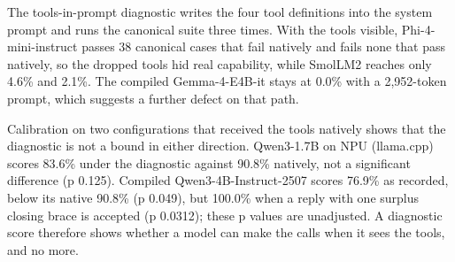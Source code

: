 \documentclass[11pt]{article}
\begin{document}
The tools-in-prompt diagnostic writes the four tool definitions into the system prompt and runs the canonical suite three times. With the tools visible, Phi-4-mini-instruct passes 38 canonical cases that fail natively and fails none that pass natively, so the dropped tools hid real capability, while SmolLM2 reaches only 4.6\% and 2.1\%. The compiled Gemma-4-E4B-it stays at 0.0\% with a 2,952-token prompt, which suggests a further defect on that path.

Calibration on two configurations that received the tools natively shows that the diagnostic is not a bound in either direction. Qwen3-1.7B on NPU (llama.cpp) scores 83.6\% under the diagnostic against 90.8\% natively, not a significant difference (p 0.125). Compiled Qwen3-4B-Instruct-2507 scores 76.9\% as recorded, below its native 90.8\% (p 0.049), but 100.0\% when a reply with one surplus closing brace is accepted (p 0.0312); these p values are unadjusted. A diagnostic score therefore shows whether a model can make the calls when it sees the tools, and no more.
\end{document}
